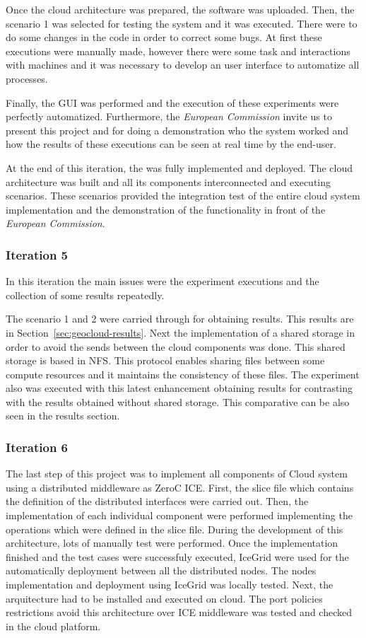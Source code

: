 Once the cloud architecture was prepared, the software was uploaded. Then, the
scenario 1 was selected for testing the system and it was executed. There were
to do some changes in the code in order to correct some bugs. At first
these executions were manually made, however there were some task and
interactions with machines and it was necessary to develop an user interface to
automatize all processes.

Finally, the \ac{GUI} was performed and the execution of these experiments were
perfectly automatized. Furthermore, the \emph{European Commission} invite us to
present this project and for doing a demonstration who the system worked and how
the results of these executions can be seen at real time by the end-user.

At the end of this iteration, the \sss was fully implemented and deployed. The
cloud architecture was built and all its components interconnected and executing
scenarios. These scenarios provided the integration test of the entire cloud
system implementation and the demonstration of the functionality in front of the
\emph{European Commission}.


\subsubsection{Iteration 5}

In this iteration the main issues were the experiment executions and the
collection of some results repeatedly. 

The scenario 1 and 2 were carried through for obtaining results. This results
are in Section~\ref{sec:geocloud-results}. Next the implementation of a shared
storage in order to avoid the sends between the cloud components was done. This
shared storage is based in \ac{NFS}. This protocol enables sharing files between
some compute resources and it maintains the consistency of these files.
The experiment also was executed with this latest enhancement obtaining results
for contrasting with the results obtained without shared storage. This
comparative can be also seen in the results section.


\subsubsection{Iteration 6} 

The last step of this project was to implement all components of Cloud system using
a distributed middleware as ZeroC ICE. First, the slice file which contains the
definition of the distributed interfaces were carried out. Then, the
implementation of each individual component were performed implementing the
operations which were defined in the slice file. During the development of this
architecture, lots of manually test were performed. Once the implementation
finished and the test cases were successfuly executed,  IceGrid were used for
the automatically deployment between all the distributed nodes. The nodes
implementation and deployment using IceGrid was locally tested. 
Next, the arquitecture had to be installed and executed on cloud. The port
policies restrictions avoid this architecture over ICE middleware was tested and
checked in the cloud platform.
 
